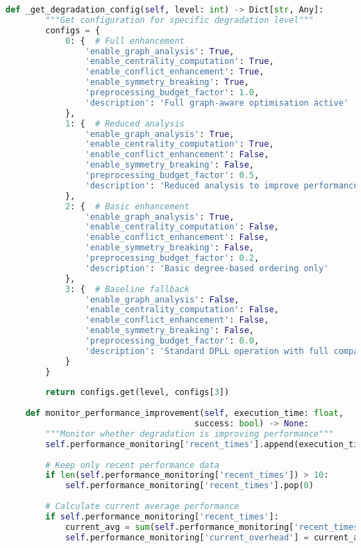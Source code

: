 \begin{lstlisting}[language=Python, caption=Graceful Degradation for Worst-Case Scenarios]
    def _get_degradation_config(self, level: int) -> Dict[str, Any]:
        """Get configuration for specific degradation level"""
        configs = {
            0: {  # Full enhancement
                'enable_graph_analysis': True,
                'enable_centrality_computation': True,
                'enable_conflict_enhancement': True,
                'enable_symmetry_breaking': True,
                'preprocessing_budget_factor': 1.0,
                'description': 'Full graph-aware optimisation active'
            },
            1: {  # Reduced analysis
                'enable_graph_analysis': True,
                'enable_centrality_computation': True,
                'enable_conflict_enhancement': False,
                'enable_symmetry_breaking': False,
                'preprocessing_budget_factor': 0.5,
                'description': 'Reduced analysis to improve performance'
            },
            2: {  # Basic enhancement
                'enable_graph_analysis': True,
                'enable_centrality_computation': False,
                'enable_conflict_enhancement': False,
                'enable_symmetry_breaking': False,
                'preprocessing_budget_factor': 0.2,
                'description': 'Basic degree-based ordering only'
            },
            3: {  # Baseline fallback
                'enable_graph_analysis': False,
                'enable_centrality_computation': False,
                'enable_conflict_enhancement': False,
                'enable_symmetry_breaking': False,
                'preprocessing_budget_factor': 0.0,
                'description': 'Standard DPLL operation with full compatibility'
            }
        }
        
        return configs.get(level, configs[3])
    
    def monitor_performance_improvement(self, execution_time: float, 
                                      success: bool) -> None:
        """Monitor whether degradation is improving performance"""
        self.performance_monitoring['recent_times'].append(execution_time)
        
        # Keep only recent performance data
        if len(self.performance_monitoring['recent_times']) > 10:
            self.performance_monitoring['recent_times'].pop(0)
        
        # Calculate current average performance
        if self.performance_monitoring['recent_times']:
            current_avg = sum(self.performance_monitoring['recent_times']) / len(self.performance_monitoring['recent_times'])
            self.performance_monitoring['current_overhead'] = current_avg / self.performance_monitoring['baseline_estimate']
    

\end{lstlisting}
